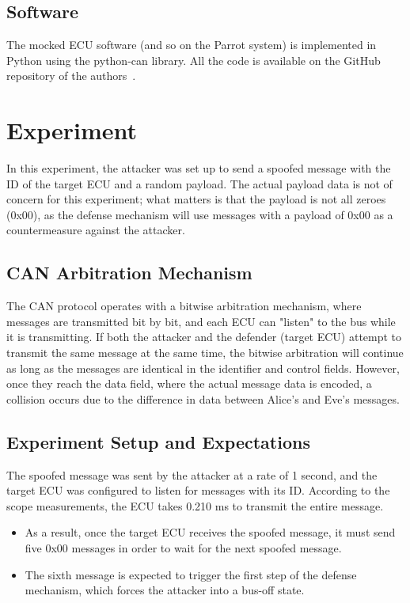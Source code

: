 \documentclass[10pt,twocolumn,letterpaper]{article}
\begin{document}
\subsection{Software}
The mocked ECU software (and so on the Parrot system) is implemented in Python using the python-can library.
All the code is available on the GitHub repository of the authors~\cite{parrot_github}.

\section{Experiment}

In this experiment, the attacker was set up to send a spoofed message with the ID of the target ECU and a random payload. The actual payload data is not of concern for this experiment; what matters is that the payload is not all zeroes (0x00), as the defense mechanism will use messages with a payload of 0x00 as a countermeasure against the attacker.

\subsection{CAN Arbitration Mechanism}

The CAN protocol operates with a bitwise arbitration mechanism, where messages are transmitted bit by bit, and each ECU can "listen" to the bus while it is transmitting. If both the attacker and the defender (target ECU) attempt to transmit the same message at the same time, the bitwise arbitration will continue as long as the messages are identical in the identifier and control fields. However, once they reach the data field, where the actual message data is encoded, a collision occurs due to the difference in data between Alice’s and Eve’s messages.

\subsection{Experiment Setup and Expectations}

The spoofed message was sent by the attacker at a rate of 1 second, and the target ECU was configured to listen for messages with its ID. According to the scope measurements, the ECU takes 0.210 ms to transmit the entire message. 

\begin{itemize}
    \item As a result, once the target ECU receives the spoofed message, it must send five 0x00 messages in order to wait for the next spoofed message.
    \item The sixth message is expected to trigger the first step of the defense mechanism, which forces the attacker into a bus-off state.
\end{itemize}
\end{document}
